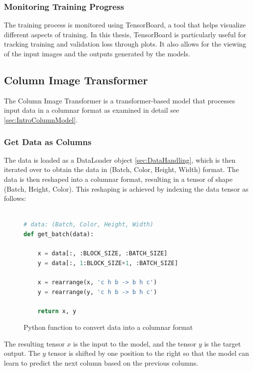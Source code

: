     \subsubsection{Monitoring Training Progress}
    
    The training process is monitored using TensorBoard, a tool that helps visualize different aspects of training. In this thesis, TensorBoard is particularly useful for tracking training and validation loss through plots. It also allows for the viewing of the input images and the outputs generated by the models.    
    
\newpage


\subsection{Column Image Transformer}
    
    The Column Image Transformer is a transformer-based model that processes input data in a columnar format as examined in detail see \autoref{sec:IntroColumnModel}.
    
    \subsubsection{Get Data as Columns}

    The data is loaded as a DataLoader object \autoref{sec:DataHandling}, which is then iterated over to obtain the data in (Batch, Color, Height, Width) format. The data is then reshaped into a columnar format, resulting in a tensor of shape (Batch, Height, Color). This reshaping is achieved by indexing the data tensor as follows:

\begin{figure}[H]
\centering
\begin{lstlisting}[language=Python]

# data: (Batch, Color, Height, Width)
def get_batch(data):

    x = data[:, :BLOCK_SIZE, :BATCH_SIZE]
    y = data[:, 1:BLOCK_SIZE+1, :BATCH_SIZE]

    x = rearrange(x, 'c h b -> b h c')
    y = rearrange(y, 'c h b -> b h c')

    return x, y
\end{lstlisting}
\caption{Python function to convert data into a columnar format}
\label{fig:get_batch_CIT}
\end{figure}

    The resulting tensor \(x\) is the input to the model, and the tensor \(y\) is the target output. The \(y\) tensor is shifted by one position to the right so that the model can learn to predict the next column based on the previous columns.

